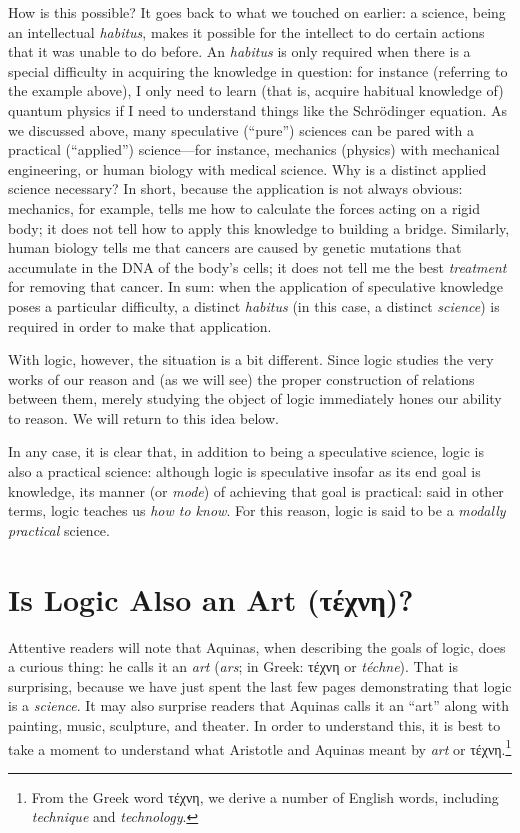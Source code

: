 \documentclass[
  12pt,
]{memoir}
\begin{document}
How is this possible? It goes back to what we touched on earlier: a
science, being an intellectual \emph{habitus}, makes it possible for the
intellect to do certain actions that it was unable to do before. An
\emph{habitus} is only required when there is a special difficulty in
acquiring the knowledge in question: for instance (referring to the
example above), I only need to learn (that is, acquire habitual
knowledge of) quantum physics if I need to understand things like the
Schrödinger equation. As we discussed above, many speculative (``pure'')
sciences can be pared with a practical (``applied'') science---for
instance, mechanics (physics) with mechanical engineering, or human
biology with medical science. Why is a distinct applied science
necessary? In short, because the application is not always obvious:
mechanics, for example, tells me how to calculate the forces acting on a
rigid body; it does not tell how to apply this knowledge to building a
bridge. Similarly, human biology tells me that cancers are caused by
genetic mutations that accumulate in the DNA of the body's cells; it
does not tell me the best \emph{treatment} for removing that cancer. In
sum: when the application of speculative knowledge poses a particular
difficulty, a distinct \emph{habitus} (in this case, a distinct
\emph{science}) is required in order to make that application.

With logic, however, the situation is a bit different. Since logic
studies the very works of our reason and (as we will see) the proper
construction of relations between them, merely studying the object of
logic immediately hones our ability to reason. We will return to this
idea below.

In any case, it is clear that, in addition to being a speculative
science, logic is also a practical science: although logic is
speculative insofar as its end goal is knowledge, its manner (or
\emph{mode}) of achieving that goal is practical: said in other terms,
logic teaches us \emph{how to know}. For this reason, logic is said to
be a \emph{modally practical} science.

\section{Is Logic Also an Art
(τέχνη)?}\label{is-logic-also-an-art-ux3c4ux3adux3c7ux3bdux3b7}

Attentive readers will note that Aquinas, when describing the goals of
logic, does a curious thing: he calls it an \emph{art} (\emph{ars}; in
Greek: τέχνη or \emph{téchne}). That is surprising, because we have just
spent the last few pages demonstrating that logic is a \emph{science}.
It may also surprise readers that Aquinas calls it an ``art'' along with
painting, music, sculpture, and theater. In order to understand this, it
is best to take a moment to understand what Aristotle and Aquinas meant
by \emph{art} or τέχνη.\footnote{From the Greek word τέχνη, we derive a
  number of English words, including \emph{technique} and
  \emph{technology}.}
\end{document}
